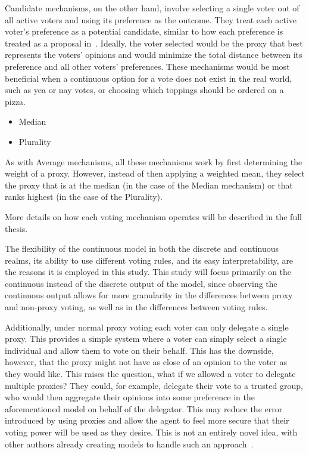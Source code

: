 Candidate mechanisms, on the other hand, involve selecting a single voter out of all
active voters and using its preference as the outcome.
They treat each active voter's preference as a potential candidate, similar to how
each preference is treated as a proposal in~\cite{Bulteau2021}.
Ideally, the voter selected would be the proxy that best represents the voters' opinions
and would minimize the total distance between its preference and all other voters'
preferences.
These mechanisms would be most beneficial when a continuous option for a vote does
not exist in the real world, such as yea or nay votes, or choosing which toppings
should be ordered on a pizza.
\begin{itemize}
    \item Median
    \item Plurality
\end{itemize}
As with Average mechanisms, all these mechanisms work by first determining the weight
of a proxy.
However, instead of then applying a weighted mean, they select the proxy that is
at the median (in the case of the Median mechanism) or that ranks highest (in the case
of the Plurality).

More details on how each voting mechanism operates will be described in the full thesis.

The flexibility of the continuous model in both the discrete and continuous realms, its
ability to use different voting rules, and its easy interpretability, are the reasons
it is employed in this study.
This study will focus primarily on the continuous instead of the discrete output of
the model, since observing the continuous output allows for more granularity in the
differences between proxy and non-proxy voting, as well as in the differences between
voting rules.

Additionally, under normal proxy voting each voter can only delegate a single proxy.
This provides a simple system where a voter can simply select a single individual and
allow them to vote on their behalf.
This has the downside, however, that the proxy might not have as close of an opinion
to the voter as they would like.
This raises the question, what if we allowed a voter to delegate multiple proxies?
They could, for example, delegate their vote to a trusted group, who would then
aggregate their opinions into some preference in the aforementioned model on behalf of
the delegator.
This may reduce the error introduced by using proxies and allow the agent to feel
more secure that their voting power will be used as they desire.
This is not an entirely novel idea, with other authors already creating models to
handle such an approach~\cite{Degrave2014,Colley2021,Golz2021}.


